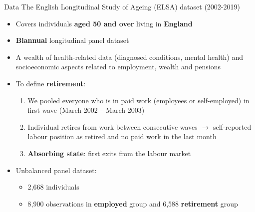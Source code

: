\documentclass{beamer}
\begin{document}
\begin{frame}{Data}
\footnotesize
The \begingroup\color{Blue}English Longitudinal Study of Ageing (ELSA) \endgroup dataset (2002-2019)

\begin{itemize}
\footnotesize
        \item Covers individuals \textbf{aged 50 and over} living in \textbf{England}
        \item \textbf{Biannual} longitudinal panel dataset
        \item A \begingroup\color{Blue}wealth  \endgroup  of health-related data (diagnosed conditions, mental health) and socioeconomic aspects related to employment, wealth and pensions

    \vspace{0.15cm}
    \item<2-> To define \textbf{retirement}: 
\begin{enumerate}
\scriptsize
        \item We pooled everyone who is in \begingroup\color{Blue}paid work \endgroup (employees or self-employed) in first wave (March 2002 – March 2003)
        \item Individual retires from work between \begingroup\color{Blue}consecutive \endgroup waves $\rightarrow$ self-reported labour position as \begingroup\color{Blue}retired \endgroup and no paid work in the last month
\item \textbf{Absorbing state}: \begingroup\color{Blue}first \endgroup exits from the labour market
       
    \end{enumerate}
    
     \vspace{0.3cm}
    \item<3-> \begingroup\color{Blue}Unbalanced \endgroup panel dataset: 
    \begin{itemize}
    \footnotesize
        \item 2,668 individuals
        \item 8,900 observations in \textbf{employed} group and 6,588 \textbf{retirement} group
    \end{itemize}

\end{itemize}
\end{frame}
\end{document}
